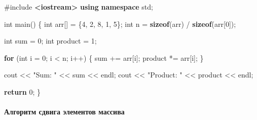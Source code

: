 \documentclass[
]{article}
\newenvironment{Shaded}{}{}
\newcommand{\ControlFlowTok}[1]{\textcolor[rgb]{0.00,0.44,0.13}{\textbf{#1}}}
\newcommand{\DataTypeTok}[1]{\textcolor[rgb]{0.56,0.13,0.00}{#1}}
\newcommand{\DecValTok}[1]{\textcolor[rgb]{0.25,0.63,0.44}{#1}}
\newcommand{\ImportTok}[1]{\textcolor[rgb]{0.00,0.50,0.00}{\textbf{#1}}}
\newcommand{\KeywordTok}[1]{\textcolor[rgb]{0.00,0.44,0.13}{\textbf{#1}}}
\newcommand{\NormalTok}[1]{#1}
\newcommand{\OperatorTok}[1]{\textcolor[rgb]{0.40,0.40,0.40}{#1}}
\newcommand{\PreprocessorTok}[1]{\textcolor[rgb]{0.74,0.48,0.00}{#1}}
\newcommand{\StringTok}[1]{\textcolor[rgb]{0.25,0.44,0.63}{#1}}
\begin{document}
\begin{Shaded}
\begin{Highlighting}[]
\PreprocessorTok{\#include }\ImportTok{\textless{}iostream\textgreater{}}
\KeywordTok{using} \KeywordTok{namespace}\NormalTok{ std}\OperatorTok{;}

\DataTypeTok{int}\NormalTok{ main}\OperatorTok{()} \OperatorTok{\{}
    \DataTypeTok{int}\NormalTok{ arr}\OperatorTok{[]} \OperatorTok{=} \OperatorTok{\{}\DecValTok{4}\OperatorTok{,} \DecValTok{2}\OperatorTok{,} \DecValTok{8}\OperatorTok{,} \DecValTok{1}\OperatorTok{,} \DecValTok{5}\OperatorTok{\};}
    \DataTypeTok{int}\NormalTok{ n }\OperatorTok{=} \KeywordTok{sizeof}\OperatorTok{(}\NormalTok{arr}\OperatorTok{)} \OperatorTok{/} \KeywordTok{sizeof}\OperatorTok{(}\NormalTok{arr}\OperatorTok{[}\DecValTok{0}\OperatorTok{]);}

    \DataTypeTok{int}\NormalTok{ sum }\OperatorTok{=} \DecValTok{0}\OperatorTok{;}
    \DataTypeTok{int}\NormalTok{ product }\OperatorTok{=} \DecValTok{1}\OperatorTok{;}

    \ControlFlowTok{for} \OperatorTok{(}\DataTypeTok{int}\NormalTok{ i }\OperatorTok{=} \DecValTok{0}\OperatorTok{;}\NormalTok{ i }\OperatorTok{\textless{}}\NormalTok{ n}\OperatorTok{;}\NormalTok{ i}\OperatorTok{++)} \OperatorTok{\{}
\NormalTok{        sum }\OperatorTok{+=}\NormalTok{ arr}\OperatorTok{[}\NormalTok{i}\OperatorTok{];}
\NormalTok{        product }\OperatorTok{*=}\NormalTok{ arr}\OperatorTok{[}\NormalTok{i}\OperatorTok{];}
    \OperatorTok{\}}

\NormalTok{    cout }\OperatorTok{\textless{}\textless{}} \StringTok{"Sum: "} \OperatorTok{\textless{}\textless{}}\NormalTok{ sum }\OperatorTok{\textless{}\textless{}}\NormalTok{ endl}\OperatorTok{;}
\NormalTok{    cout }\OperatorTok{\textless{}\textless{}} \StringTok{"Product: "} \OperatorTok{\textless{}\textless{}}\NormalTok{ product }\OperatorTok{\textless{}\textless{}}\NormalTok{ endl}\OperatorTok{;}

    \ControlFlowTok{return} \DecValTok{0}\OperatorTok{;}
\OperatorTok{\}}
\end{Highlighting}
\end{Shaded}

\paragraph{Алгоритм сдвига элементов
массива}\label{ux430ux43bux433ux43eux440ux438ux442ux43c-ux441ux434ux432ux438ux433ux430-ux44dux43bux435ux43cux435ux43dux442ux43eux432-ux43cux430ux441ux441ux438ux432ux430}
\end{document}

